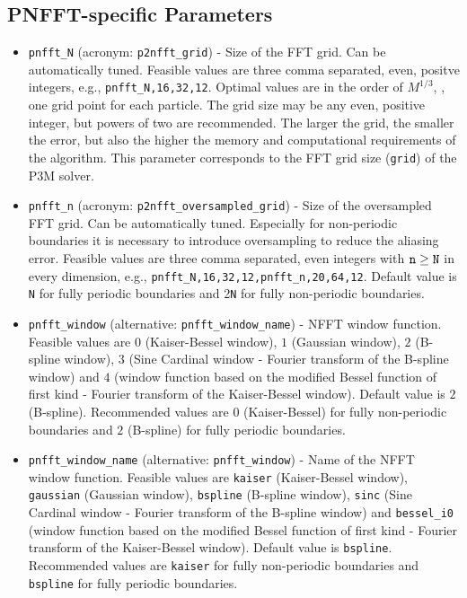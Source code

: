 \subsection{PNFFT-specific Parameters}
\begin{itemize}
  \item \verb!pnfft_N! (acronym: \verb!p2nfft_grid!) -
    Size of the FFT grid. Can be automatically tuned.
    Feasible values are three comma separated, even, positve integers, e.g., \verb!pnfft_N,16,32,12!.
    Optimal values are in the order of $M^{1/3}$, \ie, one grid point for each particle.
    The grid size may be any even, positive integer, but powers of
    two are recommended. The larger the grid, the smaller the
    error, but also the higher the memory and computational requirements
    of the algorithm.
    This parameter corresponds to the FFT grid size (\verb!grid!) of the P3M solver.
  \item \verb!pnfft_n! (acronym: \verb!p2nfft_oversampled_grid!) -
    Size of the oversampled FFT grid. Can be automatically tuned.
    Especially for non-periodic boundaries it is necessary to introduce oversampling to reduce the aliasing error.
    Feasible values are three comma separated, even integers with $\verb!n! \ge \verb!N!$ in every dimension, e.g., \verb!pnfft_N,16,32,12,pnfft_n,20,64,12!.
    Default value is \verb!N! for fully periodic boundaries and 2\verb!N! for fully non-periodic
    boundaries.
  \item \verb!pnfft_window! (alternative: \verb!pnfft_window_name!) -
    NFFT window function. Feasible values are $0$ (Kaiser-Bessel window), $1$ (Gaussian window),
    $2$ (B-spline window), $3$ (Sine Cardinal window - Fourier transform of the B-spline window) and $4$
    (window function based on the modified Bessel function of first kind - Fourier transform of the Kaiser-Bessel window).
    Default value is $2$ (B-spline). Recommended values are $0$ (Kaiser-Bessel) for fully non-periodic boundaries and $2$ (B-spline) for fully periodic boundaries.
  \item \verb!pnfft_window_name! (alternative: \verb!pnfft_window!) -
    Name of the NFFT window function. Feasible values are \verb!kaiser! (Kaiser-Bessel window), \verb!gaussian! (Gaussian window),
    \verb!bspline! (B-spline window), \verb!sinc! (Sine Cardinal window - Fourier transform of the B-spline window) and \verb!bessel_i0!
    (window function based on the modified Bessel function of first kind - Fourier transform of the Kaiser-Bessel window).
    Default value is \verb!bspline!. Recommended values are \verb!kaiser! for fully non-periodic boundaries and \verb!bspline! for fully periodic boundaries.

\end{itemize}
